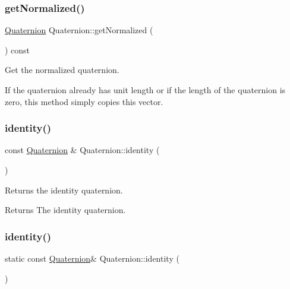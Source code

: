 \subsubsection{\texorpdfstring{get\+Normalized()}{getNormalized()}\hspace{0.1cm}{\footnotesize\ttfamily [2/2]}}
{\footnotesize\ttfamily \hyperlink{classQuaternion}{Quaternion} Quaternion\+::get\+Normalized (\begin{DoxyParamCaption}{ }\end{DoxyParamCaption}) const}

Get the normalized quaternion.

If the quaternion already has unit length or if the length of the quaternion is zero, this method simply copies this vector. \mbox{\label{classQuaternion_a2094c622fd0efd4d47de5b840cfbbd2a}} 
\subsubsection{\texorpdfstring{identity()}{identity()}\hspace{0.1cm}{\footnotesize\ttfamily [1/2]}}
{\footnotesize\ttfamily const \hyperlink{classQuaternion}{Quaternion} \& Quaternion\+::identity (\begin{DoxyParamCaption}{ }\end{DoxyParamCaption})\hspace{0.3cm}{\ttfamily [static]}}

Returns the identity quaternion.

\begin{DoxyReturn}{Returns}
The identity quaternion. 
\end{DoxyReturn}
\mbox{\label{classQuaternion_ab201296bf4af9977fb3357d31b5f5378}} 
\subsubsection{\texorpdfstring{identity()}{identity()}\hspace{0.1cm}{\footnotesize\ttfamily [2/2]}}
{\footnotesize\ttfamily static const \hyperlink{classQuaternion}{Quaternion}\& Quaternion\+::identity (\begin{DoxyParamCaption}{ }\end{DoxyParamCaption})\hspace{0.3cm}{\ttfamily [static]}}

